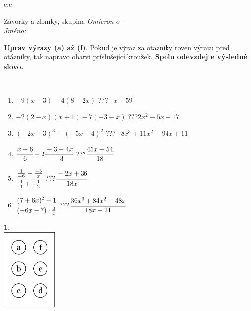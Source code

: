 \documentclass[10pt]{report}
\newcommand\omicron{o}
\begin{document}
\begin{tabular}{c:c}
\begin{minipage}[c][104.5mm][t]{0.5\linewidth}
\begin{center}
\vspace{7mm}
{\huge Závorky a zlomky, skupina \textit{Omicron $\omicron$} -}\\[5mm]
\textit{Jméno:}\phantom{xxxxxxxxxxxxxxxxxxxxxxxxxxxxxxxxxxxxxxxxxxxxxxxxxxxxxxxxxxxxxxxxx}\\[5mm]
\begin{minipage}{0.95\linewidth}
\begin{center}
\textbf{Uprav výrazy (a) až (f)}. Pokud je výraz za otazníky roven výrazu pred otázniky, tak napravo obarvi príslušející kroužek. \textbf{Spolu odevzdejte výsledné slovo.}
\end{center}
\end{minipage}
\\[1mm]
\begin{minipage}{0.79\linewidth}
\begin{center}
\begin{varwidth}{\linewidth}
\begin{enumerate}
\normalsize
\item $-9(x+3)-4(8-2x)$\quad \dotfill\; ???\;\dotfill \quad $-x-59$
\item $-2(2-x)(x+1)-7(-3-x)$\quad \dotfill\; ???\;\dotfill \quad $2x^2-5x-17$
\item $(-2x+3)^3-(-5x-4)^2$\quad \dotfill\; ???\;\dotfill \quad $-8x^3+11x^2-94x+11$
\item $\cfrac{x-6}{6}-2\cfrac{-3-4x}{-3}$\quad \dotfill\; ???\;\dotfill \quad $\cfrac{45x+54}{18}$
\item $\cfrac{\frac{1}{-6}-\frac{-3}{x}}{\frac{1}{1}+\frac{-1}{-2}}$\quad \dotfill\; ???\;\dotfill \quad $\cfrac{-2x+36}{18x}$
\item $\cfrac{(7+6x)^2-1}{(-6x-7)\cdot\frac{3}{x}}$\quad \dotfill\; ???\;\dotfill \quad $\cfrac{36x^3+84x^2-48x}{18x-21}$
\end{enumerate}
\end{varwidth}
\end{center}
\end{minipage}
\begin{minipage}{0.20\linewidth}
\begin{center}
{\Huge\bfseries 1.} \\[2mm]
\includegraphics[height=40mm]{../images/braille.png}

\end{center}
\end{minipage}
\end{center}
\end{minipage}
\end{tabular}
\end{document}
